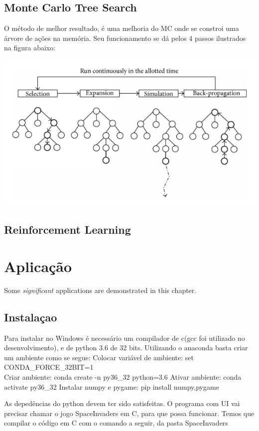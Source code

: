 \documentclass[]{book}
\begin{document}
\section{Monte Carlo Tree Search}\label{monte-carlo-tree-search}

O método de melhor resultado, é uma melhoria do MC onde se constroi uma
árvore de ações na memória. Seu funcionamento se dá pelos 4 passos
ilustrados na figura abaixo:

\begin{center}\includegraphics[width=0.5\linewidth]{content/imgs/MCTS} \end{center}

\section{Reinforcement Learning}\label{reinforcement-learning}

\chapter{Aplicação}\label{app}

Some \emph{significant} applications are demonstrated in this chapter.

\section{Instalaçao}\label{instalauxe7ao}

Para instalar no Windows é necessário um compilador de c(gcc foi
utilizado no desenvolvimento), e de python 3.6 de 32 bits. Utilizando o
anaconda basta criar um ambiente como se segue: Colocar variável de
ambiente: set CONDA\_FORCE\_32BIT=1\\
Criar ambiente: conda create -n py36\_32 python=3.6 Ativar ambiente:
conda activate py36\_32 Instalar numpy e pygame: pip install
numpy,pygame

As depedências do python devem ter sido satisfeitas. O programa com UI
vai precisar chamar o jogo SpaceInvaders em C, para que possa funcionar.
Temos que compilar o código em C com o comando a seguir, da pasta
SpaceInvaders
\end{document}
